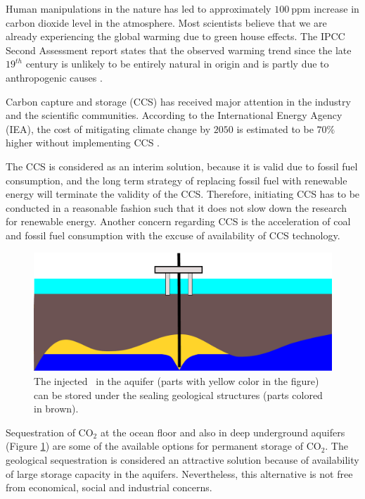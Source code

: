 Human manipulations in the nature has led to approximately $100~\mbox{ppm}$ increase in carbon dioxide level in the atmosphere. Most scientists believe that we are already experiencing the global warming due to green house effects. The IPCC Second Assessment report states that the observed warming trend since the late $19^{th}$ century is unlikely to be entirely natural in origin and is partly due to anthropogenic causes \cite{change1995ipcc}. 

Carbon capture and storage (CCS) has received major attention in the industry and the scientific communities. According to the International Energy Agency (IEA), the cost of mitigating climate change by $2050$ is estimated to be $70\%$ higher without implementing CCS \cite{iaeScenario}.

The CCS is considered as an interim solution, because it is valid due to fossil fuel consumption, and the long term strategy of replacing fossil fuel with renewable energy will terminate the validity of the CCS. Therefore, initiating CCS has to be conducted in a reasonable fashion such that it does not slow down the research for renewable energy. Another concern regarding CCS is the acceleration of coal and fossil fuel consumption with the excuse of availability of CCS technology.

\begin{figure}
  \centering
  \includegraphics[width=0.65 \linewidth]{./figurer/platform} 
  \caption{The injected \coo\ in the aquifer (parts with yellow color in the figure) can be stored under the sealing geological structures (parts colored in brown).}
  \label{fig:platform}
%
\end{figure}


Sequestration of CO$_2$ at the ocean floor and also in deep underground aquifers (Figure \ref{fig:platform}) are some of the available options for permanent storage of $\mbox{CO}_2$. The geological sequestration is considered an attractive solution because of availability of large storage capacity in the aquifers. Nevertheless, this alternative is not free from economical, social and industrial concerns.  

